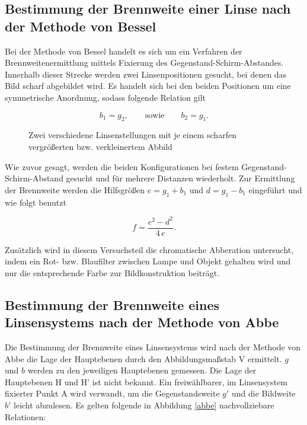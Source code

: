 \subsection[Methode von Bessel]{Bestimmung der Brennweite einer Linse nach der Methode von Bessel}
Bei der Methode von Bessel handelt es sich um ein Verfahren der Brennweitenermittlung mittels Fixierung des Gegenstand-Schirm-Abstandes.
Innerhalb dieser Strecke werden zwei Linsenpositionen gesucht, bei denen das Bild scharf abgebildet wird. Es handelt sich bei den beiden
Positionen um eine symmetrische Anordnung, sodass folgende Relation gilt

\begin{equation}
 b_1 = g_2, \qquad \text{sowie} \qquad b_2 = g_1.
\end{equation}

\begin{figure}[H]
 
 \caption{Zwei verschiedene Linsenstellungen mit je einem scharfen vergrößerten bzw. verkleinertem Abbild}
\end{figure}

Wie zuvor gesagt, werden die beiden Konfigurationen bei festem Gegenstand-Schirm-Abstand gesucht und für mehrere Distanzen wiederholt.
Zur Ermittlung der Brennweite werden die Hilfsgrößen $e = g_1 + b_1$ und $d = g_1 - b_1$ eingeführt und wie folgt benutzt

\begin{equation}
 f = \frac{e^2-d^2}{4 \, e}.
 \label{Bessel}
\end{equation}

Zusätzlich wird in diesem Versuchsteil die chromatische Abberation untersucht, indem ein Rot- bzw. Blaufilter zwischen Lampe und Objekt
gehalten wird und nur die entsprechende Farbe zur Bildkonstruktion beiträgt. 

\subsection[Methode von Abbe]{Bestimmung der Brennweite eines Linsensystems nach der Methode von Abbe}
Die Bestimmung der Brennweite eines Linsensystems wird nach der Methode von Abbe die Lage der Hauptebenen durch den Abbildungsmaßstab V
ermittelt. $g$ und $b$ werden zu den jeweiligen Hauptebenen gemessen. Die Lage der Hauptebenen H und H' ist nicht bekannt. Ein freiwählbarer,
im Linsensystem fixierter Punkt A wird verwandt, um die Gegenstandsweite $g'$ und die Bildweite $b'$ leicht abzulesen. Es gelten folgende
in Abbildung \ref{abbe} nachvollziebare Relationen:

